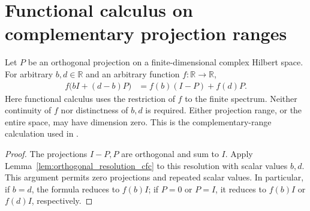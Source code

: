 \section{Functional calculus on complementary projection ranges}
\label{sec:projection_calculus}

\begin{theorem}
    \label{thm:area_law_affine_projection_calculus}
    \leanok
    Let $P$ be an orthogonal projection on a finite-dimensional complex
    Hilbert space. For arbitrary $b,d\in\mathbb R$ and an arbitrary
    function $f:\mathbb R\to\mathbb R$,
    \begin{align}
        f\bigl(bI+(d-b)P\bigr) & =f(b)(I-P)+f(d)P.
        \label{eq:affine_projection_calculus}
    \end{align}
    Here functional calculus uses the restriction of $f$ to the finite
    spectrum. Neither continuity of $f$ nor distinctness of $b,d$ is required.
    Either projection range, or the entire space, may have dimension zero.
    This is the complementary-range calculation used in
    \cite[Section~7, lines~603--640]{OpenAI2026AreaLaw}.
\end{theorem}

\begin{proof}\leanok
    The projections $I-P,P$ are orthogonal and sum to $I$. Apply
    Lemma~\ref{lem:orthogonal_resolution_cfc} to this resolution with scalar
    values $b,d$. This argument permits zero projections and repeated scalar
    values. In particular, if $b=d$, the formula reduces to $f(b)I$; if
    $P=0$ or $P=I$, it reduces to $f(b)I$ or $f(d)I$, respectively.
\end{proof}
